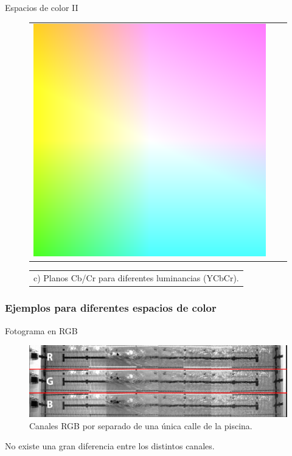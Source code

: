 \documentclass[11pt]{beamer}
\begin{document}
\begin{frame}{Espacios de color II}
\begin{figure}[h!]
\begin{tabular}{ccc}
                    \includegraphics[height=0.25\textheight,keepaspectratio]{imagenes/YCbCr_Y100.png} \\
                \end{tabular}
                \begin{tabular}{c}
                     c) Planos Cb/Cr para diferentes luminancias (YCbCr).
                \end{tabular}
            \end{figure}
        \end{frame}
        
        \subsubsection{Ejemplos para diferentes espacios de color}
        
         \begin{frame}{Fotograma en RGB}
            \begin{figure}
                \centering
                \includegraphics[scale=0.22]{imagenes/RGB_LANE.png}  
                \caption{Canales RGB por separado de una única calle de la piscina.}
                \label{fig:callergb}
            \end{figure}
             No existe una gran diferencia entre los distintos canales.
         \end{frame}
         
\end{document}
